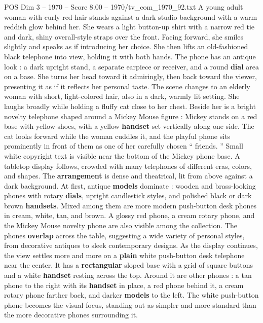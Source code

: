 \begin{textsample}{POS Dim 3 – 1970 – Score 8.00 – 1970/tv\_com\_1970\_92.txt}  \label{ex:f3_pos_034}
A young adult woman with curly red hair stands against a dark studio background with a warm reddish glow behind her.
She wears a light button-up shirt with a narrow red tie and dark, shiny overall-style straps over the front.
Facing forward, she smiles slightly and speaks as if introducing her choice.
She then lifts an old-fashioned black telephone into view, holding it with both hands.
The phone has an antique look : a dark upright stand, a separate earpiece or receiver, and a round \textbf{dial} area on a base.
She turns her head toward it admiringly, then back toward the viewer, presenting it as if it reflects her personal taste.
The scene changes to an elderly woman with short, light-colored hair, also in a dark, warmly lit setting.
She laughs broadly while holding a fluffy cat close to her chest.
Beside her is a bright novelty telephone shaped around a Mickey Mouse figure : Mickey stands on a red base with yellow shoes, with a yellow \textbf{handset} set vertically along one side.
The cat looks forward while the woman cuddles it, and the playful phone sits prominently in front of them as one of her carefully chosen “ friends. ” Small white copyright text is visible near the bottom of the Mickey phone base.
A tabletop display follows, crowded with many telephones of different eras, colors, and shapes.
The \textbf{arrangement} is dense and theatrical, lit from above against a dark background.
At first, antique \textbf{models} dominate : wooden and brass-looking phones with rotary \textbf{dials}, upright candlestick styles, and polished black or dark brown \textbf{handsets}.
Mixed among them are more modern push-button desk phones in cream, white, tan, and brown.
A glossy red phone, a cream rotary phone, and the Mickey Mouse novelty phone are also visible among the collection.
The phones \textbf{overlap} across the table, suggesting a wide variety of personal styles, from decorative antiques to sleek contemporary designs.
As the display continues, the view settles more and more on a \textbf{plain} white push-button desk telephone near the center.
It has a \textbf{rectangular} sloped base with a grid of square buttons and a white \textbf{handset} resting across the top.
Around it are other phones : a tan phone to the right with its \textbf{handset} in place, a red phone behind it, a cream rotary phone farther back, and darker \textbf{models} to the left.
The white push-button phone becomes the visual focus, standing out as simpler and more standard than the more decorative phones surrounding it.

\end{textsample}
